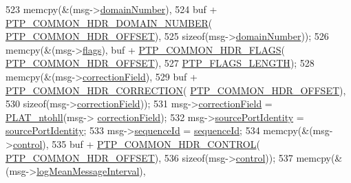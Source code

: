 \begin{DoxyCode}
{{{{{{{{{523     memcpy(&(msg->\hyperlink{class_p_t_p_message_common_a0443527ff087aecea2cac4f6e84d189c}{domainNumber}),
524            buf + \hyperlink{avbts__message_8hpp_aeba19234aadc9ec2ce3ec7b439a79c54}{PTP\_COMMON\_HDR\_DOMAIN\_NUMBER}(
      \hyperlink{avbts__message_8hpp_a330dd502b6e19949d74c8f3a96dd5667}{PTP\_COMMON\_HDR\_OFFSET}),
525            \textcolor{keyword}{sizeof}(msg->\hyperlink{class_p_t_p_message_common_a0443527ff087aecea2cac4f6e84d189c}{domainNumber}));
526     memcpy(&(msg->\hyperlink{class_p_t_p_message_common_a8c2f6104634deb80d932fa0cd9166fba}{flags}), buf + \hyperlink{avbts__message_8hpp_a60148b9c4d7f51e723a3ae8dd73e7851}{PTP\_COMMON\_HDR\_FLAGS}(
      \hyperlink{avbts__message_8hpp_a330dd502b6e19949d74c8f3a96dd5667}{PTP\_COMMON\_HDR\_OFFSET}),
527            \hyperlink{avbts__message_8hpp_ad8b20c17c21a3024f129fc556d5382c2}{PTP\_FLAGS\_LENGTH});
528     memcpy(&(msg->\hyperlink{class_p_t_p_message_common_a635b707dac6610b5b159be5c8ec1891e}{correctionField}),
529            buf + \hyperlink{avbts__message_8hpp_a86a729fd44989d68c1ebe5c385839743}{PTP\_COMMON\_HDR\_CORRECTION}(
      \hyperlink{avbts__message_8hpp_a330dd502b6e19949d74c8f3a96dd5667}{PTP\_COMMON\_HDR\_OFFSET}),
530            \textcolor{keyword}{sizeof}(msg->\hyperlink{class_p_t_p_message_common_a635b707dac6610b5b159be5c8ec1891e}{correctionField}));
531     msg->\hyperlink{class_p_t_p_message_common_a635b707dac6610b5b159be5c8ec1891e}{correctionField} = \hyperlink{linux_2src_2platform_8cpp_ac83360d6774b1f7aee4267184ce6e974}{PLAT\_ntohll}(msg->
      \hyperlink{class_p_t_p_message_common_a635b707dac6610b5b159be5c8ec1891e}{correctionField});
532     msg->\hyperlink{class_p_t_p_message_common_a415b5544bdd3ea41dae460fa1af900d9}{sourcePortIdentity} = \hyperlink{class_p_t_p_message_common_a415b5544bdd3ea41dae460fa1af900d9}{sourcePortIdentity};
533     msg->\hyperlink{class_p_t_p_message_common_a189710d5cff10c03f77d72a276a5f58e}{sequenceId} = \hyperlink{class_p_t_p_message_common_a189710d5cff10c03f77d72a276a5f58e}{sequenceId};
534     memcpy(&(msg->\hyperlink{class_p_t_p_message_common_a7de6f8422e6ca5ade1aeac73a44ec6f0}{control}),
535            buf + \hyperlink{avbts__message_8hpp_a57eb3ca9235cff4177a75bb7c0b8d6a2}{PTP\_COMMON\_HDR\_CONTROL}(
      \hyperlink{avbts__message_8hpp_a330dd502b6e19949d74c8f3a96dd5667}{PTP\_COMMON\_HDR\_OFFSET}),
536            \textcolor{keyword}{sizeof}(msg->\hyperlink{class_p_t_p_message_common_a7de6f8422e6ca5ade1aeac73a44ec6f0}{control}));
537     memcpy(&(msg->\hyperlink{class_p_t_p_message_common_a2f897c329a52f79528d1b1248254dd1b}{logMeanMessageInterval}),
}}}}}}}}}
\end{DoxyCode}
